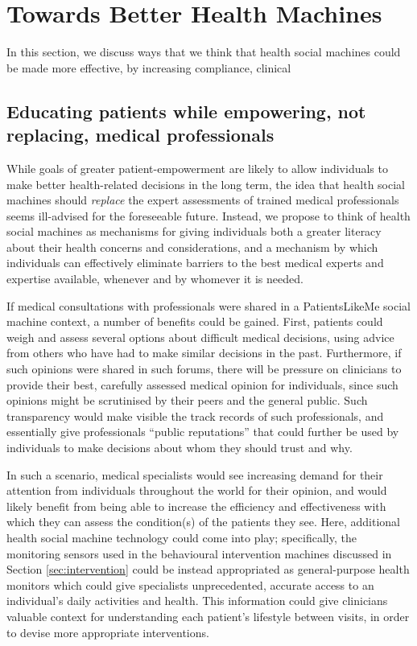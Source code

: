 \documentclass{sig-alternate}
\begin{document}
\section{Towards Better Health Machines}

In this section, we discuss ways that we think that health social
machines could be made more effective, by increasing compliance,
clinical 

\subsection{Educating patients while empowering, not replacing, medical professionals}

While goals of greater patient-empowerment are likely to allow
individuals to make better health-related decisions in the long term,
the idea that health social machines should \emph{replace} the expert
assessments of trained medical professionals seems ill-advised for the
foreseeable future. Instead, we propose to think of health social
machines as mechanisms for giving individuals both a greater literacy
about their health concerns and considerations, and a mechanism by
which individuals can effectively eliminate barriers to the best
medical experts and expertise available, whenever and by whomever it
is needed.

If medical consultations with professionals were shared in a
PatientsLikeMe social machine context, a number of benefits could be
gained.  First, patients could weigh and assess several options about
difficult medical decisions, using advice from others who have had to
make similar decisions in the past.  Furthermore, if such opinions
were shared in such forums, there will be pressure on clinicians to
provide their best, carefully assessed medical opinion for
individuals, since such opinions might be scrutinised by their peers
and the general public.  Such transparency would make visible the
track records of such professionals, and essentially give
professionals ``public reputations'' that could further be used by
individuals to make decisions about whom they should trust and why.

In such a scenario, medical specialists would see increasing demand
for their attention from individuals throughout the world for their
opinion, and would likely benefit from being able to increase the
efficiency and effectiveness with which they can assess the
condition(s) of the patients they see.  Here, additional health social
machine technology could come into play; specifically, the monitoring
sensors used in the behavioural intervention machines discussed in
Section \ref{sec:intervention} could be instead appropriated as
general-purpose health monitors which could give specialists
unprecedented, accurate access to an individual's daily activities and
health.  This information could give clinicians valuable context for
understanding each patient's lifestyle between visits, in order to
devise more appropriate interventions.
\end{document}
